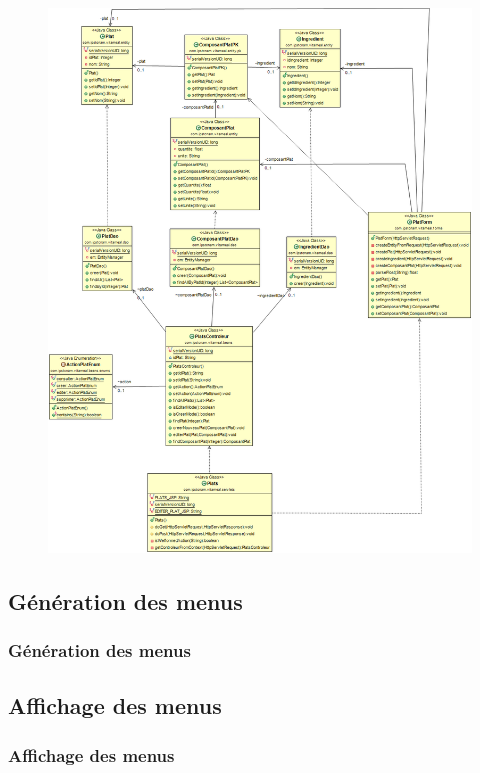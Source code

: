 \documentclass{beamer}
\begin{document}
\begin{frame}[plain]{}
\begin{figure}
\centering
\includegraphics[scale=0.175]{../CasDUtilisations/CompositionPlat/classDiagram_ComposerPlat.png}
\end{figure}
\end{frame}

\subsection{Génération des menus}
\begin{frame}
\frametitle{Génération des menus}

\end{frame}

\subsection{Affichage des menus}
\begin{frame}
\frametitle{Affichage des menus}

\end{frame}
\end{document}
